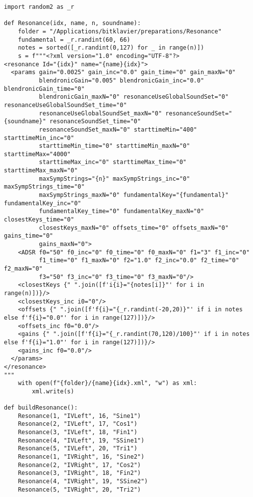 \documentclass[../main.tex]{subfiles}
\begin{document}
\begin{verbatim}
import random2 as _r

def Resonance(idx, name, n, soundname):
    folder = "/Applications/bitklavier/preparations/Resonance"
    fundamental = _r.randint(60, 66)
    notes = sorted([_r.randint(0,127) for _ in range(n)])
    s = f"""<?xml version="1.0" encoding="UTF-8"?>
<resonance Id="{idx}" name="{name}{idx}">
  <params gain="0.0025" gain_inc="0.0" gain_time="0" gain_maxN="0"
          blendronicGain="0.005" blendronicGain_inc="0.0" blendronicGain_time="0"
          blendronicGain_maxN="0" resonanceUseGlobalSoundSet="0" resonanceUseGlobalSoundSet_time="0"
          resonanceUseGlobalSoundSet_maxN="0" resonanceSoundSet="{soundname}" resonanceSoundSet_time="0"
          resonanceSoundSet_maxN="0" starttimeMin="400" starttimeMin_inc="0"
          starttimeMin_time="0" starttimeMin_maxN="0" starttimeMax="4000"
          starttimeMax_inc="0" starttimeMax_time="0" starttimeMax_maxN="0"
          maxSympStrings="{n}" maxSympStrings_inc="0" maxSympStrings_time="0"
          maxSympStrings_maxN="0" fundamentalKey="{fundamental}" fundamentalKey_inc="0"
          fundamentalKey_time="0" fundamentalKey_maxN="0" closestKeys_time="0"
          closestKeys_maxN="0" offsets_time="0" offsets_maxN="0" gains_time="0"
          gains_maxN="0">
    <ADSR f0="50" f0_inc="0" f0_time="0" f0_maxN="0" f1="3" f1_inc="0"
          f1_time="0" f1_maxN="0" f2="1.0" f2_inc="0.0" f2_time="0" f2_maxN="0"
          f3="50" f3_inc="0" f3_time="0" f3_maxN="0"/>
    <closestKeys {" ".join([f'i{i}="{notes[i]}"' for i in range(n)])}/>
    <closestKeys_inc i0="0"/>
    <offsets {" ".join([f'f{i}="{_r.randint(-20,20)}"' if i in notes else f'f{i}="0.0"' for i in range(127)])}/>
    <offsets_inc f0="0.0"/>
    <gains {" ".join([f'f{i}="{_r.randint(70,120)/100}"' if i in notes else f'f{i}="1.0"' for i in range(127)])}/>
    <gains_inc f0="0.0"/>
  </params>
</resonance>
"""
    with open(f"{folder}/{name}{idx}.xml", "w") as xml:
        xml.write(s)

def buildResonance():
    Resonance(1, "IVLeft", 16, "Sine1")
    Resonance(2, "IVLeft", 17, "Cos1")
    Resonance(3, "IVLeft", 18, "Fin1")
    Resonance(4, "IVLeft", 19, "SSine1")
    Resonance(5, "IVLeft", 20, "Tri1")
    Resonance(1, "IVRight", 16, "Sine2")
    Resonance(2, "IVRight", 17, "Cos2")
    Resonance(3, "IVRight", 18, "Fin2")
    Resonance(4, "IVRight", 19, "SSine2")
    Resonance(5, "IVRight", 20, "Tri2")
\end{verbatim}
\end{document}
